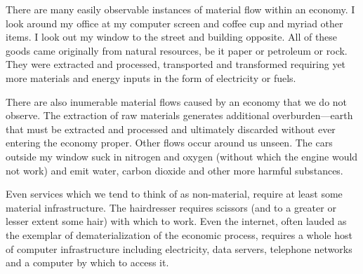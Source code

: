  

There are many easily observable instances of material flow within an
economy. I look around my office at my computer screen and coffee cup
and myriad other items. I look out my window to the street and building
opposite. All of these goods came originally from natural 
resources, 
be it paper or petroleum or rock. They were extracted and processed, transported and
transformed requiring yet more materials and energy inputs in the form of
electricity or fuels. 

There are also inumerable material flows caused by an economy that we do not observe.
The extraction of raw materials generates additional overburden---earth that must be
extracted and processed and ultimately discarded without ever entering the economy
proper. Other flows occur around us unseen. The cars outside my window suck in nitrogen
and oxygen (without which the engine would not work) and emit water, carbon dioxide and
other more harmful substances. 

Even services which we tend to think of as non-material, require at least some material
infrastructure. The hairdresser requires scissors (and to a greater or lesser extent 
some hair) with which to work. Even the internet, often lauded as the exemplar of
dematerialization of the economic process, requires a whole host of computer
infrastructure including electricity, data servers, telephone networks and a
computer by which to access it.

